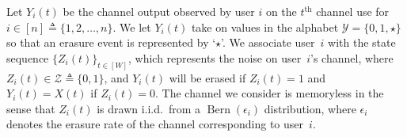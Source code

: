 Let $Y_{i}(t)$ be the channel output observed by user $i$ on the $t^{\mathrm{th}}$ channel use for $i \in [n] \triangleq \{1, 2, \ldots, n\}$. %
We let $Y_{i}(t)$ take on values in the alphabet $\mathcal{Y} = \{0, 1, \star\}$ so that an erasure event is represented by `$\star$'.   
%
We associate user~$i$ with the state sequence $\{Z_i(t)\}_{t \in [W]}$, which represents the noise on user~$i$'s channel, where $Z_i(t) \in \mathcal{Z} \triangleq \{0,1\}$,  and  $Y_i(t)$ will be erased if $Z_{i}(t) = 1$ and $Y_{i}(t) = X(t)$ if $Z_i(t) = 0$.  The channel we consider is memoryless in the sense that $Z_{i}(t)$ is drawn i.i.d.\ from a $\operatorname{Bern}(\epsilon_{i})$ distribution, where
$\epsilon_i$ denotes the erasure rate of the channel corresponding to user~$i$.

